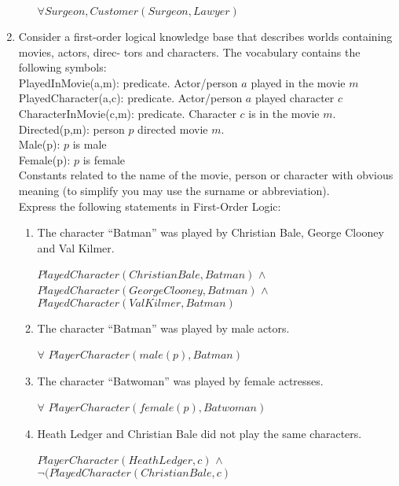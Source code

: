 \documentclass[paper=a4, fontsize=11pt]{scrartcl} %
\numberwithin{equation}{section} %
\numberwithin{figure}{section} %
\numberwithin{table}{section} %
\begin{document}
\begin{enumerate}
\begin{enumerate}
		$\forall Surgeon, Customer(Surgeon, Lawyer)$\\
		
	\end{enumerate}

	\item
	Consider a first-order logical knowledge base that describes worlds containing movies, actors, direc-
	tors and characters. The vocabulary contains the following symbols:\\
	
	PlayedInMovie(a,m): predicate. Actor/person $a$ played in the movie $m$\\
	PlayedCharacter(a,c): predicate. Actor/person $a$ played character $c$\\
	CharacterInMovie(c,m): predicate. Character $c$ is in the movie $m$.\\
	Directed(p,m): person $p$ directed movie $m$.\\
	Male(p): $p$ is male\\
	Female(p): $p$ is female\\
	Constants related to the name of the movie, person or character with obvious meaning (to simplify you may use the surname or abbreviation).\\

	Express the following statements in First-Order Logic:\\
	\begin{enumerate}
		\item
		The character “Batman” was played by Christian Bale, George Clooney and Val Kilmer.
		
		$PlayedCharacter(Christian Bale, Batman)$ $\wedge$ $PlayedCharacter(George Clooney, Batman)$ $\wedge$ $PlayedCharacter(Val Kilmer, Batman)$\\
		
		\item
		The character “Batman” was played by male actors.

		$\forall$ $PlayerCharacter(male(p), Batman)$\\
		
		\item
		The character “Batwoman” was played by female actresses.
		
		$\forall$ $PlayerCharacter(female(p), Batwoman)$\\

		\item
		Heath Ledger and Christian Bale did not play the same characters.

		$PlayerCharacter(Heath Ledger, c)$ $\wedge$ $\neg(PlayedCharacter(Christian Bale, c)$\\
				

\end{enumerate}
\end{enumerate}
\end{document}
